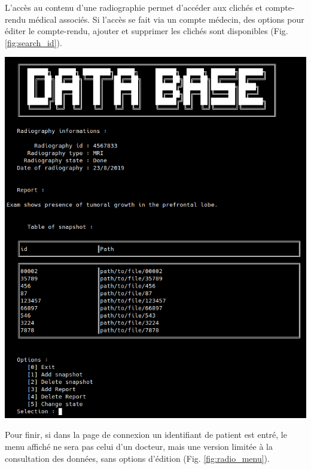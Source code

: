 \documentclass[12pt,a4paper]{article}
\newenvironment{Figure}
{\par\medskip\noindent\minipage{\linewidth}}
{\endminipage\par\medskip}
\begin{document}
\begin{multicols}{2}
		L'accès au contenu d'une radiographie permet d'accéder aux clichés et compte-rendu médical associés. Si l'accès se fait via un compte médecin, des options pour éditer le compte-rendu, ajouter et supprimer les clichés sont disponibles (Fig. \ref{fig:search_id}).
		\begin{Figure}
			\centering
			\includegraphics[width=\linewidth]{images/walkthrough/doctor_patient_searchid.png}
			\label{fig:search_id}
		\end{Figure}
		
		Pour finir, si dans la page de connexion un identifiant de patient est entré, le menu affiché ne sera pas celui d'un docteur, mais une version limitée à la consultation des données, sans options d'édition (Fig. \ref{fig:radio_menu}). \\
		

\end{multicols}
\end{document}
